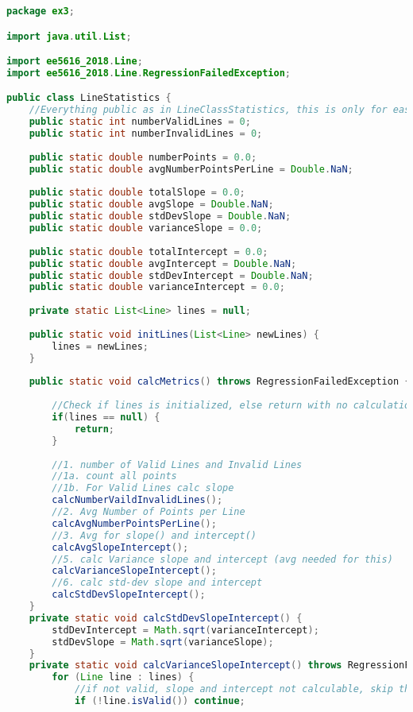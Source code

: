 \begin{lstlisting}[language=java,
    label=lst:ls,
    caption=LineStatistics holds all statistics correspondign to the whole set of Lines
]
package ex3;

import java.util.List;

import ee5616_2018.Line;
import ee5616_2018.Line.RegressionFailedException;

public class LineStatistics {
	//Everything public as in LineClassStatistics, this is only for easier access
	public static int numberValidLines = 0;
	public static int numberInvalidLines = 0;
	
	public static double numberPoints = 0.0;
	public static double avgNumberPointsPerLine = Double.NaN;
	
	public static double totalSlope = 0.0;
	public static double avgSlope = Double.NaN;
	public static double stdDevSlope = Double.NaN;
	public static double varianceSlope = 0.0;
	
	public static double totalIntercept = 0.0;
	public static double avgIntercept = Double.NaN;
	public static double stdDevIntercept = Double.NaN;
	public static double varianceIntercept = 0.0;
	
	private static List<Line> lines = null;
	
	public static void initLines(List<Line> newLines) {
		lines = newLines;
	}
	
	public static void calcMetrics() throws RegressionFailedException {
		
		//Check if lines is initialized, else return with no calculation
		if(lines == null) {
			return;
		}
		
		//1. number of Valid Lines and Invalid Lines
		//1a. count all points
		//1b. For Valid Lines calc slope
		calcNumberVaildInvalidLines();
		//2. Avg Number of Points per Line
		calcAvgNumberPointsPerLine();
		//3. Avg for slope() and intercept()
		calcAvgSlopeIntercept();
		//5. calc Variance slope and intercept (avg needed for this)
		calcVarianceSlopeIntercept();
		//6. calc std-dev slope and intercept
		calcStdDevSlopeIntercept();
	}
	private static void calcStdDevSlopeIntercept() {
		stdDevIntercept = Math.sqrt(varianceIntercept);
		stdDevSlope = Math.sqrt(varianceSlope);
	}
	private static void calcVarianceSlopeIntercept() throws RegressionFailedException {
		for (Line line : lines) {
			//if not valid, slope and intercept not calculable, skip this line
			if (!line.isValid()) continue;
			

\end{lstlisting}
